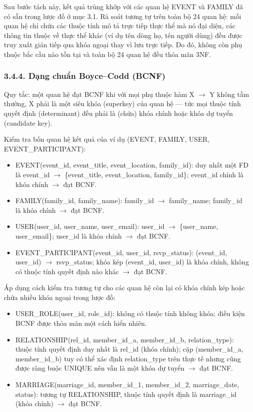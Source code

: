 Sau bước tách này, kết quả trùng khớp với các quan hệ EVENT và FAMILY đã có sẵn trong lược đồ ở mục 3.1. Rà soát tương tự trên toàn bộ 24 quan hệ: mỗi quan hệ chỉ chứa các thuộc tính mô tả trực tiếp thực thể mà nó đại diện, các thông tin thuộc về thực thể khác (ví dụ tên dòng họ, tên người dùng) đều được truy xuất gián tiếp qua khóa ngoại thay vì lưu trực tiếp. Do đó, không còn phụ thuộc bắc cầu nào tồn tại và toàn bộ 24 quan hệ đều thỏa mãn 3NF.

\subsubsection{3.4.4. Dạng chuẩn Boyce--Codd (BCNF)}

Quy tắc: một quan hệ đạt BCNF khi với mọi phụ thuộc hàm X $\rightarrow$ Y không tầm thường, X phải là một siêu khóa (superkey) của quan hệ --- tức mọi thuộc tính quyết định (determinant) đều phải là (chứa) khóa chính hoặc khóa dự tuyển (candidate key).

Kiểm tra bốn quan hệ kết quả của ví dụ (EVENT, FAMILY, USER, EVENT\_PARTICIPANT):

\begin{itemize}
	\item EVENT(event\_id, event\_title, event\_location, family\_id): duy nhất một FD là event\_id $\rightarrow$ \{event\_title, event\_location, family\_id\}; event\_id chính là khóa chính $\rightarrow$ đạt BCNF.
	\item FAMILY(family\_id, family\_name): family\_id $\rightarrow$ family\_name; family\_id là khóa chính $\rightarrow$ đạt BCNF.
	\item USER(user\_id, user\_name, user\_email): user\_id $\rightarrow$ \{user\_name, user\_email\}; user\_id là khóa chính $\rightarrow$ đạt BCNF.
	\item EVENT\_PARTICIPANT(event\_id, user\_id, rsvp\_status): (event\_id, user\_id) $\rightarrow$ rsvp\_status; khóa kép (event\_id, user\_id) là khóa chính, không có thuộc tính quyết định nào khác $\rightarrow$ đạt BCNF.
\end{itemize}

Áp dụng cách kiểm tra tương tự cho các quan hệ còn lại có khóa chính kép hoặc chứa nhiều khóa ngoại trong lược đồ:

\begin{itemize}
	\item USER\_ROLE(user\_id, role\_id): không có thuộc tính không khóa; điều kiện BCNF được thỏa mãn một cách hiển nhiên.
	\item RELATIONSHIP(rel\_id, member\_id\_a, member\_id\_b, relation\_type): thuộc tính quyết định duy nhất là rel\_id (khóa chính); cặp (member\_id\_a, member\_id\_b) tuy có thể xác định relation\_type trên thực tế nhưng cũng được ràng buộc UNIQUE nên vẫn là một khóa dự tuyển $\rightarrow$ đạt BCNF.
	\item MARRIAGE(marriage\_id, member\_id\_1, member\_id\_2, marriage\_date, status): tương tự RELATIONSHIP, thuộc tính quyết định là marriage\_id (khóa chính) $\rightarrow$ đạt BCNF.
\end{itemize}

